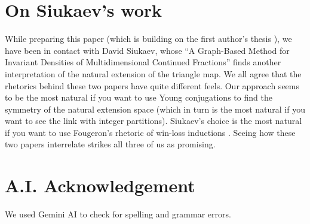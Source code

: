 \documentclass[12pt,oneside,openany]{article}
\begin{document}
\section{ On Siukaev's work}\label{Siukaev}

While preparing this paper (which is building on the first author's thesis \cite{Fox}), we have been in contact with  David Siukaev, whose ``A Graph-Based Method for Invariant Densities of Multidimensional Continued Fractions'' \cite{Siukaev} finds another interpretation of the natural extension of the triangle map.  We all agree that the rhetorics behind these two papers have quite  different feels.  Our approach seems to be the most natural if you want to use Young conjugations to find the symmetry of the natural extension space (which in turn is the most natural if you want to see the link with integer partitions).  Siukaev's choice is the most natural if you want to use Fougeron's rhetoric of win-loss inductions \cite{Fougeron20, Fougeron24}.  Seeing how these two papers interrelate strikes all three of us as promising.


\section{A.I. Acknowledgement}
We used Gemini AI to check for spelling and grammar errors.  
\end{document}
